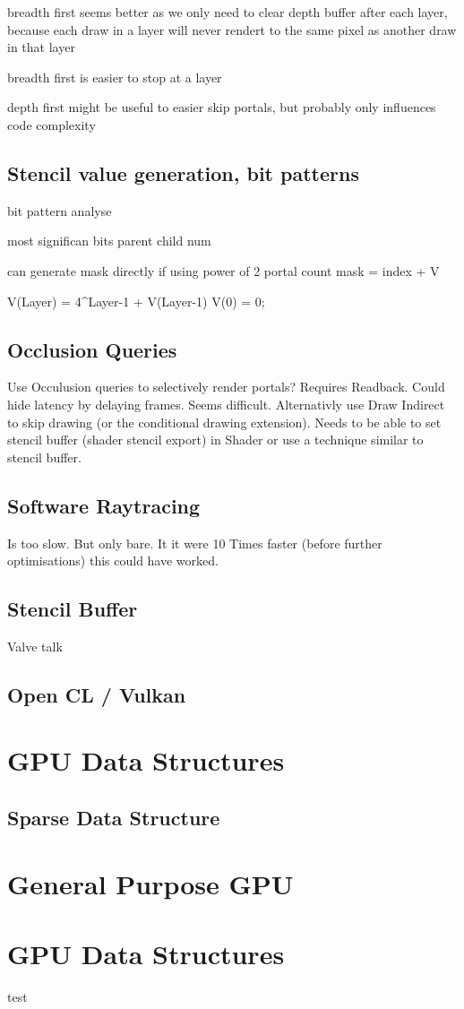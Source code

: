 breadth first seems better as we only need to clear depth buffer after each layer, because
each draw in a layer will never rendert to the same pixel as another draw in that layer

breadth first is easier to stop at a layer

depth first might be useful to easier skip portals, but probably only influences code complexity

\subsection{Stencil value generation, bit patterns}
bit pattern analyse

most significan bits parent child num

can generate mask directly if using power of 2 portal count
mask = index + V

V(Layer) = 4^{Layer-1} + V(Layer-1)
V(0) = 0;



\subsection{Occlusion Queries}
Use Occulusion queries to selectively render portals? Requires Readback. Could hide latency by delaying frames. Seems difficult.
Alternativly use Draw Indirect to skip drawing (or the conditional drawing extension). Needs to be able to set stencil buffer (shader stencil export) in Shader or use a technique similar to stencil buffer.


\subsection{Software Raytracing}
Is too slow. But only bare. It it were 10 Times faster (before further optimisations) this could have worked.


\subsection{Stencil Buffer}
Valve talk

\subsection{Open CL / Vulkan}
\section{GPU Data Structures}
\subsection{Sparse Data Structure}

\section{General Purpose GPU}

\section{GPU Data Structures}

test \cite{Heuser:2003}